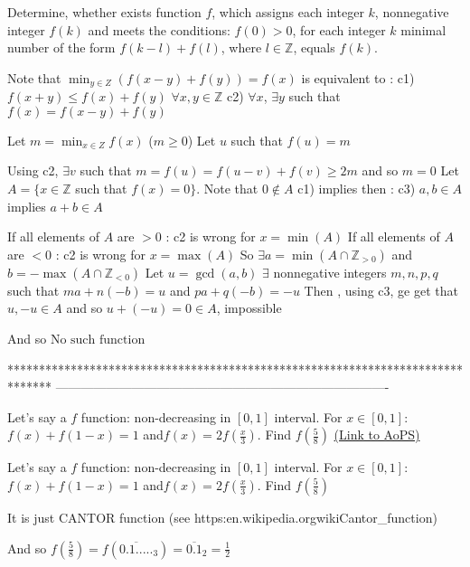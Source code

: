 \begin{solution}
	\begin{tcolorbox}Determine, whether exists function $f$, which assigns each integer $k$, nonnegative integer $f(k)$ and meets the conditions:
$f(0) > 0$,
for each integer $k$ minimal number of the form $f(k - l) + f(l)$, where $l \in \mathbb{Z}$, equals $f(k)$.\end{tcolorbox}
Note that $\min_{y\in Z}(f(x-y)+f(y))=f(x)$ is equivalent to :
c1) $f(x+y)\le f(x)+f(y)$ $\forall x,y\in\mathbb Z$
c2) $\forall x$, $\exists y$ such that $f(x)=f(x-y)+f(y)$

Let $m=\min_{x\in Z}f(x)$ ($m\ge 0$)
Let $u$ such that $f(u)=m$

Using c2, $\exists v$ such that $m=f(u)=f(u-v)+f(v)\ge 2m$ and so $m=0$
Let $A=\{x\in\mathbb Z$ such that $f(x)=0\}$. Note that $0\notin A$
c1) implies then : c3) $a,b\in A$ implies $a+b\in A$

If all elements of $A$ are $>0$ : c2 is wrong for $x=\min (A)$
If all elements of $A$ are $<0$ : c2 is wrong for $x=\max (A)$
So $\exists a=\min(A\cap\mathbb Z_{>0})$ and $b=-\max(A\cap\mathbb Z_{<0})$
Let $u=\gcd(a,b)$
$\exists$ nonnegative integers $m,n,p,q$ such that $ma+n(-b)=u$ and $pa+q(-b)=-u$
Then , using c3, ge get that $u,-u\in A$ and so $u+(-u)=0\in A$, impossible

And so $\boxed{\text{No such function}}$




\end{solution}
*******************************************************************************
-------------------------------------------------------------------------------

\begin{problem}
	Let's say a $f$ function: non-decreasing in $[0,1]$ interval. For $x\in[0,1]$: $f(x) + f(1-x)=1$ and$f(x)=2f(\frac{x}{3})$. Find $ f(\frac {5} {8}) $
	\flushright \href{https://artofproblemsolving.com/community/c6h1636426}{(Link to AoPS)}
\end{problem}



\begin{solution}
	\begin{tcolorbox}Let's say a $f$ function: non-decreasing in $[0,1]$ interval. For $x\in[0,1]$: $f(x) + f(1-x)=1$ and$f(x)=2f(\frac{x}{3})$. Find $ f(\frac {5} {8}) $\end{tcolorbox}

It is just CANTOR function (see https:\/\/en.wikipedia.org\/wiki\/Cantor_function)

And so $f(\frac 58)=f(\overline{0.1.....}_3)=\overline{0.1}_2=\frac 12$

\end{solution}



